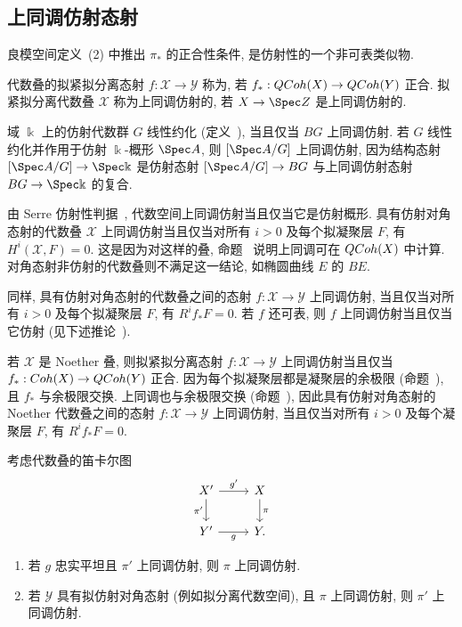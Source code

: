 \subsection{上同调仿射态射}\label{src:7.5.2-subsection}
良模空间定义~(2) 中推出 $\pi_*$ 的正合性条件, 是仿射性的一个非可表类似物.
\begin{definition}[上同调仿射]\label{src:7.5.15}
代数叠的拟紧拟分离态射 $f:\mathcal X\to\mathcal Y$ 称为, 若 $f_*:QCoh(X)\to QCoh(Y)$ 正合. 拟紧拟分离代数叠 $\mathcal X$ 称为上同调仿射的, 若 $\mathcal X\to\Spec\mathbb Z$ 是上同调仿射的.
\end{definition}
\begin{example}\label{src:7.5.16}
域 $\Bbbk$ 上的仿射代数群 $G$ 线性约化 (定义~), 当且仅当 $BG$ 上同调仿射. 若 $G$ 线性约化并作用于仿射 $\Bbbk$-概形 $\Spec A$, 则 $[\Spec A/G]$ 上同调仿射, 因为结构态射 $[\Spec A/G]\to\Spec\Bbbk$ 是仿射态射 $[\Spec A/G]\to BG$ 与上同调仿射态射 $BG\to\Spec\Bbbk$ 的复合.
\end{example}
\begin{remark}\label{src:7.5.17}
由 Serre 仿射性判据~, 代数空间上同调仿射当且仅当它是仿射概形. 具有仿射对角态射的代数叠 $\mathcal X$ 上同调仿射当且仅当对所有 $i>0$ 及每个拟凝聚层 $F$, 有 $H^i(\mathcal X,F)=0$. 这是因为对这样的叠, 命题~ 说明上同调可在 $QCoh(X)$ 中计算. 对角态射非仿射的代数叠则不满足这一结论, 如椭圆曲线 $E$ 的 $BE$.

同样, 具有仿射对角态射的代数叠之间的态射 $f:\mathcal X\to\mathcal Y$ 上同调仿射, 当且仅当对所有 $i>0$ 及每个拟凝聚层 $F$, 有 $R^if_*F=0$. 若 $f$ 还可表, 则 $f$ 上同调仿射当且仅当它仿射 (见下述推论~).
\end{remark}
\begin{remark}[Noether 情形]\label{src:7.5.18}
若 $\mathcal X$ 是 Noether 叠, 则拟紧拟分离态射 $f:\mathcal X\to\mathcal Y$ 上同调仿射当且仅当 $f_*:Coh(X)\to QCoh(Y)$ 正合. 因为每个拟凝聚层都是凝聚层的余极限 (命题~), 且 $f_*$ 与余极限交换. 上同调也与余极限交换 (命题~), 因此具有仿射对角态射的 Noether 代数叠之间的态射 $f:\mathcal X\to\mathcal Y$ 上同调仿射, 当且仅当对所有 $i>0$ 及每个凝聚层 $F$, 有 $R^if_*F=0$.
\end{remark}
\begin{lemma}\label{src:7.5.19}
考虑代数叠的笛卡尔图
\begin{align*}
\begin{tikzcd}[ampersand replacement=\&]
\mathcal X'\arrow[r,"{g'}"]\arrow[d,"{\pi'}"']\&\mathcal X\arrow[d,"{\pi}"]\\
\mathcal Y'\arrow[r,"{g}"']\&\mathcal Y.
\end{tikzcd}
\end{align*}
\begin{enumerate}[(1)]
\item 若 $g$ 忠实平坦且 $\pi'$ 上同调仿射, 则 $\pi$ 上同调仿射.
\item 若 $\mathcal Y$ 具有拟仿射对角态射 (例如拟分离代数空间), 且 $\pi$ 上同调仿射, 则 $\pi'$ 上同调仿射.
\end{enumerate}
\end{lemma}
